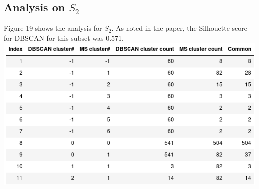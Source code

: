 \documentclass[12pt,a4paper]{article}
\begin{document}
\subsection{Analysis on $S_2$}
Figure 19 shows the analysis for $S_2$. As noted in the paper, the Silhouette score for DBSCAN for this subset was 0.571. \\

\includegraphics[scale=0.65]{clustering.png}
\begingroup
{}
\endgroup
\end{document}
